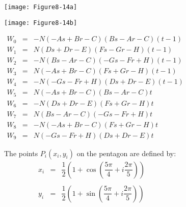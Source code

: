 \begin{description}
    \begin{figure}[!htb]
        \centering
        \begin{subfigure}{0.48\linewidth}
            \centering
            \texttt{[image: Figure8-14a]}
            \caption*{}
        \end{subfigure}
        \hfill
        \begin{subfigure}{0.48\linewidth}
            \centering
            \texttt{[image: Figure8-14b]}
            \caption*{}
        \end{subfigure}
        \hfill
        \begin{subfigure}{0.48\linewidth}
            \centering
            \begin{equation*}
            \begin{array}{lll}
            W_0 &=& -N(-As + Br - C)(Bs-Ar-C)(t - 1) \\
            W_1 &=& N(Ds+Dr-E)(Fs-Gr-H)(t-1) \\
            W_2 &=& -N(Bs -Ar -C)(-Gs-Fr+H)(t - 1)\\
            W_3 &=& N(-As + Br -C)(Fs + Gr - H)(t - 1) \\
            W_4 &=& -N(-Gs - Fr + H)(Ds + Dr - E)(t - 1) \\
            W_5 &=& N(-As +Br - C)(Bs -Ar -C)t \\
            W_6 &=& -N(Ds + Dr - E)(Fs + Gr - H)t\\
            W_7 &=& N(Bs - Ar -C)(-Gs -Fr + H)t \\
            W_8 &=& -N(-As + Br -C)(Fs + Gr - H)t \\
            W_9 &=& N(-Gs - Fr + H)(Ds + Dr -E)t
            \end{array}
            \end{equation*}
        \end{subfigure}%
        \hfill
        \begin{subfigure}{0.48\linewidth}
            \centering
            The points $P_i(x_i, y_i)$ on the pentagon are defined by:
            \begin{equation*}
            \begin{array}{lll}
            x_i &=& \dfrac{1}{2}\left(1 +\cos\left(\dfrac{5\pi}{4} + i \dfrac{2\pi}{5}\right)\right) \\ \\
            y_i &=& \dfrac{1}{2}\left(1 +\sin\left(\dfrac{5\pi}{4} + i \dfrac{2\pi}{5}\right)\right) \\ \\

\end{array}
\end{equation*}
\end{subfigure}
\end{figure}
\end{description}
